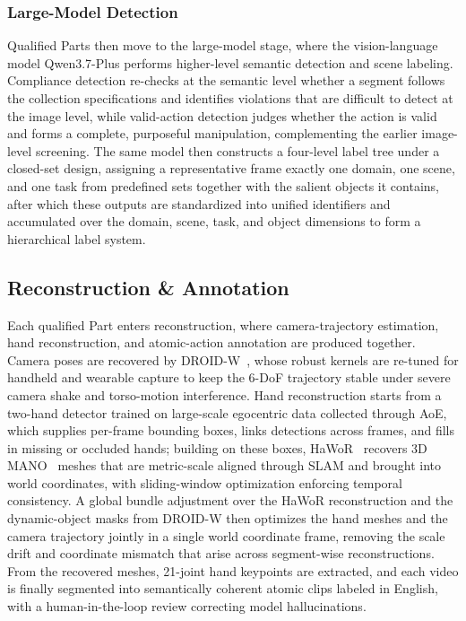 \subsubsection{Large-Model Detection}

Qualified Parts then move to the large-model stage, where the vision-language model Qwen3.7-Plus performs higher-level semantic detection and scene labeling.
Compliance detection re-checks at the semantic level whether a segment follows the collection specifications and identifies violations that are difficult to detect at the image level, while valid-action detection judges whether the action is valid and forms a complete, purposeful manipulation, complementing the earlier image-level screening.
The same model then constructs a four-level label tree under a closed-set design, assigning a representative frame exactly one domain, one scene, and one task from predefined sets together with the salient objects it contains, after which these outputs are standardized into unified identifiers and accumulated over the domain, scene, task, and object dimensions to form a hierarchical label system.

\subsection{Reconstruction \& Annotation}

Each qualified Part enters reconstruction, where camera-trajectory estimation, hand reconstruction, and atomic-action annotation are produced together.
Camera poses are recovered by DROID-W~\cite{droidw2026}, whose robust kernels are re-tuned for handheld and wearable capture to keep the 6-DoF trajectory stable under severe camera shake and torso-motion interference.
Hand reconstruction starts from a two-hand detector trained on large-scale egocentric data collected through AoE, which supplies per-frame bounding boxes, links detections across frames, and fills in missing or occluded hands; building on these boxes, HaWoR~\cite{hawor2025} recovers 3D MANO~\cite{mano2017} meshes that are metric-scale aligned through SLAM and brought into world coordinates, with sliding-window optimization enforcing temporal consistency.
A global bundle adjustment over the HaWoR reconstruction and the dynamic-object masks from DROID-W then optimizes the hand meshes and the camera trajectory jointly in a single world coordinate frame, removing the scale drift and coordinate mismatch that arise across segment-wise reconstructions.
From the recovered meshes, 21-joint hand keypoints are extracted, and each video is finally segmented into semantically coherent atomic clips labeled in English, with a human-in-the-loop review correcting model hallucinations.

